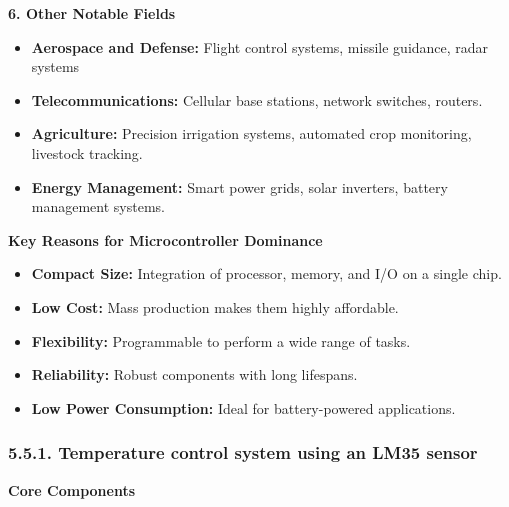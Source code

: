 \documentclass[
]{article}
\begin{document}
\textbf{6. Other Notable Fields}

\begin{itemize}
\item
  \textbf{Aerospace and Defense:} Flight control systems, missile
  guidance, radar systems
\item
  \textbf{Telecommunications:} Cellular base stations, network switches,
  routers.
\item
  \textbf{Agriculture:} Precision irrigation systems, automated crop
  monitoring, livestock tracking.
\item
  \textbf{Energy Management:} Smart power grids, solar inverters,
  battery management systems.
\end{itemize}

\textbf{Key Reasons for Microcontroller Dominance}

\begin{itemize}
\item
  \textbf{Compact Size:} Integration of processor, memory, and I/O on a
  single chip.
\item
  \textbf{Low Cost:} Mass production makes them highly affordable.
\item
  \textbf{Flexibility:} Programmable to perform a wide range of tasks.
\item
  \textbf{Reliability:} Robust components with long lifespans.
\item
  \textbf{Low Power Consumption:} Ideal for battery-powered
  applications.
\end{itemize}

\hypertarget{551-temperature-control-system-using-an-lm35-sensor}{%
\subsubsection{5.5.1. Temperature control system using an LM35
sensor}\label{551-temperature-control-system-using-an-lm35-sensor}}

\textbf{Core Components}
\end{document}
